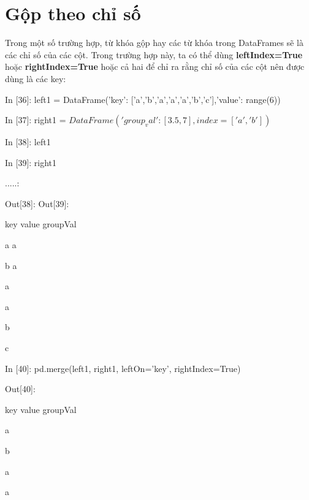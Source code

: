 \section{Gộp theo chỉ số}
Trong một số trường hợp, từ khóa gộp hay các từ khóa trong DataFrames sẽ là các chỉ số của các cột. Trong trường hợp này, ta có thể dùng \textbf{leftIndex=True} hoặc \textbf{rightIndex=True} hoặc cả hai để chỉ ra rằng chỉ số của các cột nên được dùng là các key: \par
    \quad\textup{In [36]: left1 = DataFrame({'key': ['a','b','a','a','a','b','c'],'value': range(6)})}\par

     \quad\textup{In [37]: right1 = $DataFrame({'group_val': [3.5, 7]}, index=['a', 'b'])$
}\par
     \quad\textup{In [38]: left1 }\par
     \quad\textup{In [39]: right1}\par
     \quad\textup{.....:}\par
     \quad\textup{Out[38]: \quad\quad\quad\quad\quad Out[39]:}\par
     \quad \quad key \quad value \quad \quad\quad\quad\quad groupVal \par
      \quad a \quad \quad {} \quad\quad\quad a \quad\quad{} \par
      \quad b \quad \quad {} \quad\quad\quad a \quad\quad{} \par
      \quad a \quad \quad {}  \par
      \quad a \quad \quad {} \par
      \quad b \quad \quad {} \par
      \quad c \quad \quad {} \\ \par
     \quad\textup{In [40]: pd.merge(left1, right1, leftOn='key', rightIndex=True) }\par
    \quad\textup{Out[40]:}\par
    \quad \quad key \quad value \quad  groupVal \par
      \quad a \quad \quad {}  \quad\quad{} \par
      \quad b \quad \quad {} \quad\quad{} \par
      \quad a \quad \quad {}  \quad\quad{} \par
      \quad a \quad \quad {} \quad\quad{} \par
